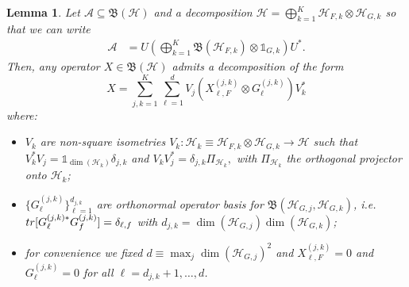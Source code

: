 \documentclass[aihp,12pt]{imsart}
\newcommand{\Hc}{\mathcal{H}}
\newcommand{\As}{\mathscr{A}}
\newcommand{\Bf}{\mathfrak{B}}
\newcommand{\one}{\mathbb{1}}
\newcommand{\tr}{{\rm tr}}
\theoremstyle{theorem}
\newtheorem{lemma}{Lemma}
\theoremstyle{definition}
\theoremstyle{remark}
\begin{document}
\begin{lemma}
    Let $\As\subseteq\Bf(\Hc)$ and a decomposition
    \(\Hc = \bigoplus_{k=1}^K \Hc_{F,k}\otimes\Hc_{G,k} \)
so that we can write
\begin{align*}
    \As &= U\left(\bigoplus_{k=1}^K \Bf(\Hc_{F,k}) \otimes \one_{G,k}\right)U^*.
\end{align*}
    Then, any operator $X\in\Bf(\Hc)$ admits a decomposition of the form \[X =\sum_{j,k=1}^K \sum_{\ell=1}^{d} V_j (X_{\ell,F}^{(j,k)}\otimes G_{\ell}^{(j,k)}) V_k^*\]
    where: \begin{itemize}
        \item $V_k$ are non-square isometries $V_k:\Hc_k\equiv\Hc_{F,k}\otimes\Hc_{G,k}\to \Hc$ such that $V_k^* V_j = \one_{\dim(\Hc_k)} \delta_{j,k}$ and $V_kV_j^* = \delta_{j,k}\Pi_{\Hc_k},$ with $\Pi_{\Hc_k}$ the orthogonal projector onto $\Hc_k$;
        \item $\{G_{\ell}^{(j,k)}\}_{\ell=1}^{d_{j,k}}$ are orthonormal operator basis for $\Bf(\Hc_{G,j},\Hc_{G,k})$, i.e. $\tr[G_\ell^{(j,k)*} G_f^{(j,k)}] = \delta_{\ell,f}$ with $d_{j,k}= \dim(\Hc_{G,j})\dim(\Hc_{G,k})$;
        \item for convenience we fixed $d\equiv\max_{j} \dim(\Hc_{G,j})^2$ and $X_{\ell,F}^{(j,k)} = 0$ and $G_{\ell}^{(j,k)}=0$ for all $\ell = d_{j,k}+1,\dots, d$. 
    \end{itemize} 
\end{lemma}
\end{document}
